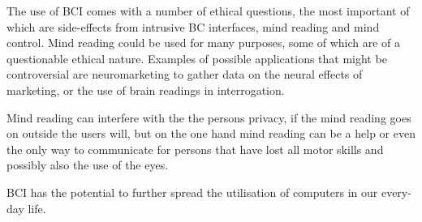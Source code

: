 The use of BCI comes with a number of ethical questions, the most important of which are side-effects from intrusive BC interfaces, mind reading and mind control. Mind reading could be used for many purposes, some of which are of a questionable ethical nature. Examples of possible applications that might be controversial are neuromarketing to gather data on the neural effects of marketing, or the use of brain readings in interrogation\cite{10.1371/journal.pbio.1001289}\cite{CB:CB252}.

Mind reading can interfere with the the persons privacy, if the mind reading goes on outside the users will, but on the one hand mind reading can be a help or even the only way to communicate for persons that have lost all motor skills and possibly also the use of the eyes.

BCI has the potential to further spread the utilisation of computers in our every-day life. 

